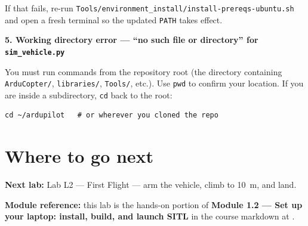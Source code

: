 \documentclass[a4paper,11pt,twoside]{article}
\begin{document}
If that fails, re-run \texttt{Tools/environment\_install/install-prereqs-ubuntu.sh} and open a fresh terminal so the updated \texttt{PATH} takes effect.

\textbf{5. Working directory error --- ``no such file or directory'' for \texttt{sim\_vehicle.py}}

You must run commands from the repository root (the directory containing \texttt{ArduCopter/}, \texttt{libraries/}, \texttt{Tools/}, etc.). Use \texttt{pwd} to confirm your location. If you are inside a subdirectory, \texttt{cd} back to the root:

\begin{Verbatim}[frame=single,fontsize=\small]
cd ~/ardupilot   # or wherever you cloned the repo
\end{Verbatim}

\section*{Where to go next}

\textbf{Next lab:} Lab L2 --- First Flight --- arm the vehicle, climb to 10~m, and land.

\textbf{Module reference:} this lab is the hands-on portion of \textbf{Module 1.2 --- Set up your laptop: install, build, and launch SITL} in the course markdown at .

\fi
\end{document}
